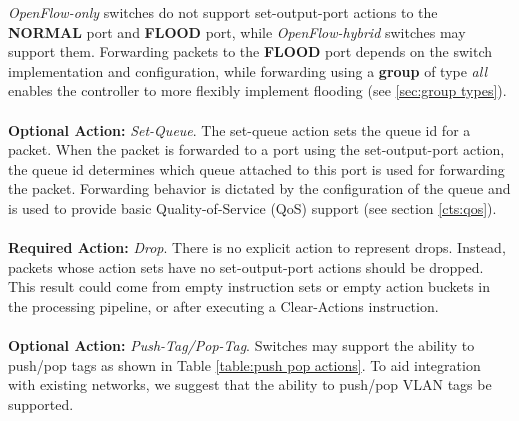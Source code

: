 \documentclass[10pt]{article}
\begin{document}
\emph{OpenFlow-only} switches do not support set-output-port actions to the \textbf{NORMAL} port and \textbf{FLOOD} port, while \emph{OpenFlow-hybrid} switches may support them. Forwarding packets to the \textbf{FLOOD} port depends on the switch implementation and configuration, while forwarding using a \textbf{group} of type \textit{all} enables the controller to more flexibly implement flooding (see \ref{sec:group types}).
\\\\
\textbf{Optional Action:} \emph{Set-Queue}. The set-queue action sets the queue id for a packet. When the packet is forwarded to a port using the set-output-port action, the queue id determines which queue attached to this port is used for forwarding the packet. Forwarding behavior is dictated by the configuration of the queue and is used to provide basic Quality-of-Service (QoS) support (see section \ref{cts:qos}).
\\\\
\textbf{Required Action:} \emph{Drop}.  There is no explicit action to represent drops.  Instead, packets whose action sets have no set-output-port actions should be dropped.  This result could come from empty instruction sets or empty action buckets in the processing pipeline, or after executing a Clear-Actions instruction.
\\\\
\textbf{Optional Action:} \emph{Push-Tag/Pop-Tag}.  Switches may support the ability to push/pop tags as shown in Table \ref{table:push pop actions}.  To aid integration with existing networks, we suggest that the ability to push/pop VLAN tags be supported.
\end{document}

